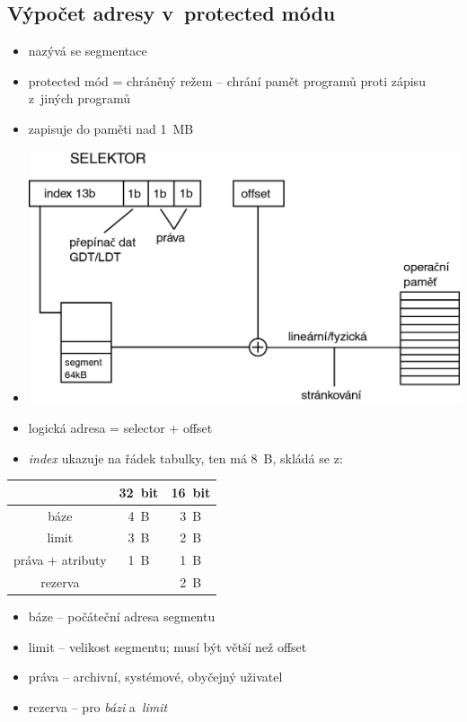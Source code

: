 \documentclass[a4paper,12pt]{article}
\providecommand{\tightlist}{%
\setlength{\itemsep}{0pt}\setlength{\parskip}{0pt}}
\begin{document}
\subsection{Výpočet adresy v~protected módu}

\begin{itemize}
\tightlist
\item nazývá se segmentace
\item protected mód = chráněný režem -- chrání pamět programů proti zápisu
z~jiných programů
\item zapisuje do paměti nad 1~MB
\item[] \includegraphics[width=13.651cm]{ref/vypocet-logicke-adresy.png}
\item logická adresa = selector + offset
\item \emph{index} ukazuje na řádek tabulky, ten má 8~B, skládá se z:
\end{itemize}

\begin{tabular}{|c|c|c|}
\hline
& 32~bit & 16~bit \\ \hline
báze & 4~B & 3~B \\ \hline
limit & 3~B & 2~B \\ \hline
práva + atributy & 1~B & 1~B \\ \hline
rezerva & & 2~B \\ \hline
\end{tabular}

\begin{itemize}
\tightlist
\item báze -- počáteční adresa segmentu
\item limit -- velikost segmentu; musí být větší než offset
\item práva -- archivní, systémové, obyčejný uživatel
\item rezerva -- pro \emph{bázi} a~\emph{limit}
\end{itemize}
\end{document}
